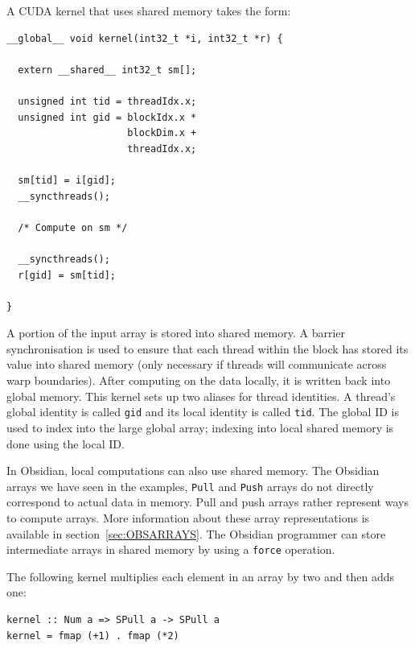 \documentclass[a4paper]{book}
\begin{document}
\pagebreak 

\noindent A CUDA kernel that uses shared memory takes the form: 

\begin{small}
\begin{Verbatim}[samepage=true]
__global__ void kernel(int32_t *i, int32_t *r) {

  extern __shared__ int32_t sm[]; 

  unsigned int tid = threadIdx.x; 
  unsigned int gid = blockIdx.x * 
                     blockDim.x + 
                     threadIdx.x;

  sm[tid] = i[gid]; 
  __syncthreads();

  /* Compute on sm */ 
     
  __syncthreads();
  r[gid] = sm[tid]; 
  
}
\end{Verbatim} 
\end{small} 

\noindent A portion of the input array is stored into shared memory. A 
barrier synchronisation is used to ensure that each thread within the block 
has stored its value into shared memory (only necessary if threads will 
communicate across warp boundaries). After computing on the data locally, 
it is written back into global memory. This kernel sets up two aliases for 
thread identities. A thread's global identity is called {\tt gid} and its local 
identity is called {\tt tid}. The global ID is used to index into the large global 
array; indexing into local shared memory is done using the local ID. 

In Obsidian, local computations can also use shared memory. The Obsidian arrays 
we have seen in the examples, {\tt Pull} and {\tt Push} arrays do not directly 
correspond to actual data in memory. Pull and push arrays rather represent ways 
to compute arrays. More information about these array representations is available 
in section~\ref{sec:OBSARRAYS}. The Obsidian programmer can store intermediate 
arrays in shared memory by using a {\tt force} operation. 

The following kernel multiplies each element in an array by two and then adds one: 

\begin{small}
\begin{Verbatim}[samepage=true] 
kernel :: Num a => SPull a -> SPull a
kernel = fmap (+1) . fmap (*2)
\end{Verbatim}
\end{small}
\end{document}
